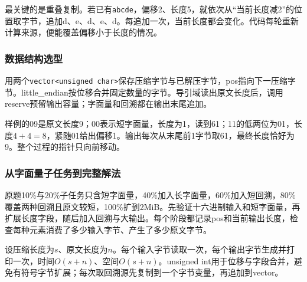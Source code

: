 \documentclass[UTF8,11pt,a4paper,fontset=none]{ctexart}
\begin{document}
最关键的是重叠复制。若已有\texttt{abcde}，偏移2、长度5，就依次从“当前长度减2”的位置取字节，追加d、e、d、e、d。每追加一次，当前长度都会变化。代码每轮重新计算来源，便能覆盖偏移小于长度的情况。

\subsubsection{数据结构选型}
用两个\texttt{vector<unsigned char>}保存压缩字节与已解压字节，pos指向下一压缩字节。little\_endian按位移合并固定数量的字节。导引域读出原文长度后，调用reserve预留输出容量；字面量和回溯都在输出末尾追加。

样例的09是原文长度9；00表示短字面量，长度为1，读到61；11的低两位为01，长度$4+4=8$，紧随01给出偏移1。输出每次从末尾前1字节取61，最终长度恰好为9。整个过程的指针只向前移动。

\subsubsection{从字面量子任务到完整解法}
原题10\%与20\%子任务只含短字面量，40\%加入长字面量，60\%加入短回溯，80\%覆盖两种回溯且原文较短，100\%扩到2MiB。先验证十六进制输入和短字面量，再扩展长度字段，随后加入回溯与大输出。每个阶段都记录pos和当前输出长度，检查每种元素消费了多少输入字节、产生了多少原文字节。

设压缩长度为$s$、原文长度为$n$。每个输入字节读取一次，每个输出字节生成并打印一次，时间$O(s+n)$、空间$O(s+n)$。unsigned int用于位移与字段合并，避免有符号字节扩展；每次取回溯源先复制到一个字节变量，再追加到vector。
\end{document}
